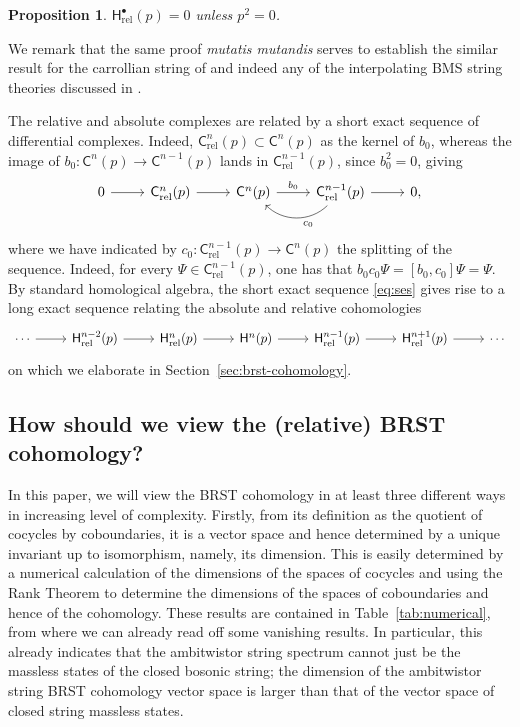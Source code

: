 \documentclass[11pt,reqno,a4paper,final]{amsart}
\theoremstyle{plain}
\newtheorem{proposition}[lemma]{Proposition}
\theoremstyle{definition}
\newcommand{\sC}{\mathsf{C}}
\newcommand{\sH}{\mathsf{H}}
\newcommand{\Crel}{\mathsf{C}_{\mathrm{rel}}} %
\newcommand{\Hrel}{\mathsf{H}_{\mathrm{rel}}}
\newcommand{\1}{\mathbb{1}}
\numberwithin{equation}{section}
\begin{document}
\begin{proposition}\label{prop:on-shell}
  $\Hrel^\bullet(p) = 0$ unless $p^2 = 0$.
\end{proposition}

We remark that the same proof \emph{mutatis mutandis} serves to
establish the similar result for the carrollian string of
\cite{Figueroa-OFarrill:2025njv} and indeed any of the interpolating
BMS string theories discussed in \cite[§6]{Figueroa-OFarrill:2025njv}.

The relative and absolute complexes are related by a short exact
sequence of differential complexes.  Indeed, $\Crel^n(p) \subset
\sC^n(p)$ as the kernel of $b_0$, whereas the image of $b_0 \colon
\sC^n(p) \to \sC^{n-1}(p)$ lands in $\Crel^{n-1}(p)$, since $b_0^2 =
0$, giving
\begin{equation}
  \label{eq:ses}
  \begin{tikzcd}
    0 \arrow[r] & \Crel^n(p) \arrow[r] & \sC^n(p) \arrow[r,"b_0"] & \Crel^{n
      -1}(p) \arrow[r] \arrow[l, bend left=45, "c_0" pos=0.45] & 0,
  \end{tikzcd}
\end{equation}
where we have indicated by $c_0 \colon \Crel^{n-1}(p) \to \sC^n(p)$
the splitting of the sequence.  Indeed, for every $\Psi \in
\Crel^{n-1}(p)$, one has that $b_0 c_0 \Psi = [b_0,c_0] \Psi = \Psi$.
By standard homological algebra, the short exact sequence
\eqref{eq:ses} gives rise to a long exact sequence relating the
absolute and relative cohomologies
\begin{equation}
  \begin{tikzcd}
    \cdots \arrow[r] & \Hrel^{n-2}(p) \arrow[r] & \Hrel^n(p) \arrow[r] & \sH^n(p) \arrow[r] & \Hrel^{n-1}(p)
    \arrow[r] & \Hrel^{n+1}(p) \arrow[r] & \cdots
  \end{tikzcd}
\end{equation}
on which we elaborate in Section~\ref{sec:brst-cohomology}.

\subsection{How should we view the (relative) BRST cohomology? }
\label{sec:what-is-the-cohomology}

In this paper, we will view the BRST cohomology in at least three
different ways in increasing level of complexity. Firstly, from its
definition as the quotient of cocycles by coboundaries, it is a vector
space and hence determined by a unique invariant up to isomorphism,
namely, its dimension. This is easily determined by a numerical
calculation of the dimensions of the spaces of cocycles and using the
Rank Theorem to determine the dimensions of the spaces of coboundaries
and hence of the cohomology. These results are contained in
Table~\ref{tab:numerical}, from where we can already read off some
vanishing results. In particular, this already indicates that the 
ambitwistor string spectrum cannot just be the massless states of
the closed bosonic string; the dimension of the ambitwistor string 
BRST cohomology vector space is larger than that of the vector space of
closed string massless states.
\end{document}
